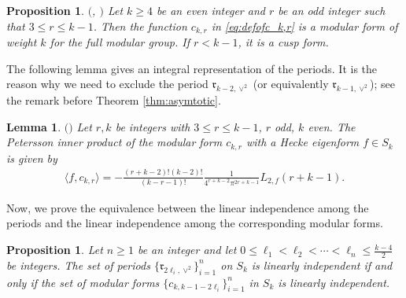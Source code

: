 \documentclass[11pt,letterpaper,reqno]{amsart}
\numberwithin{figure}{section}
\numberwithin{table}{section}
\theoremstyle{definition}
\theoremstyle{plain}
\newtheorem{lemma}[theorem]{Lemma}
\newtheorem{proposition}[theorem]{Proposition}
\theoremstyle{definition}
\theoremstyle{definition}
\theoremstyle{remark}
\numberwithin{equation}{section}
\theoremstyle{remark}
\begin{document}
\begin{proposition}$($\cite[Theorem 6.2]{Cohen'smodularformC_k}, \cite[p.114]{Zagier1977M}$)$
    Let $k\geq4$ be an even integer and $r$ be an odd integer such that $3\leq r\leq k-1$. Then the function $c_{k,r}$ in \eqref{eq:defofc_k,r} is a modular form of weight $k$ for the full modular group. If $r<k-1$, it is a cusp form.\end{proposition} 
    The following lemma gives an integral representation of the periods. It is the reason why we need to exclude the period $\mathfrak{r}_{k-2,\vee^2}$ (or equivalently $\mathfrak{r}_{k-1,\vee^2}$); see the remark before Theorem \ref{thm:asymtotic}.
\begin{lemma}$($\cite[Theorem 2]{Zagier1977M}$)$ \label{lem:integralperiods}
    Let $r,k$ be integers with $3\leq r\leq k-1$, $r$ odd, $k$ even. The Petersson inner product of the modular form $c_{k,r}$ with a  Hecke eigenform $f\in S_k$ is given by
    \begin{align}
        \langle f,c_{k,r}\rangle=-\frac{(r+k-2)!(k-2)!}{(k-r-1)!}\frac{1}{4^{r+k-2}\pi^{2r+k-1}}L_{2,f}(r+k-1).\label{eq:integralperiods}
    \end{align}
\end{lemma} 
Now, we prove the equivalence between the linear independence among the periods and the linear independence among the corresponding modular forms. 
\begin{proposition} \label{prop:equivalence}
  Let $n\ge1$ be an integer and let $0\leq\ell_1<\ell_2<\cdots<\ell_n\leq\frac{k-4}{2}$ be integers.  The set of periods $\{\mathfrak{r}_{2\ell_i,\vee^2}\}_{i=1}^n$ on $S_k$ is linearly independent if and only if the set of modular forms $\{c_{k,k-1-2\ell_i}\}_{i=1}^n$ in $S_k$ is linearly independent.
\end{proposition}
\end{document}

